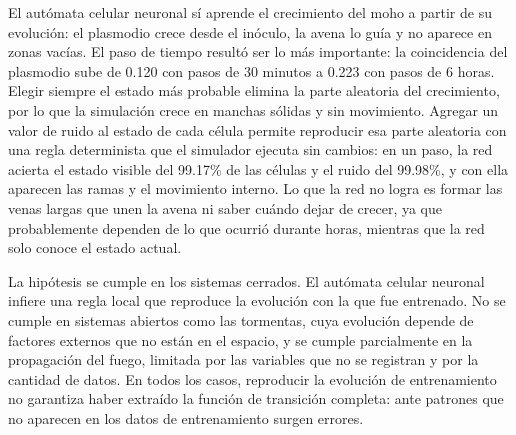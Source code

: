 El autómata celular neuronal sí aprende el crecimiento del moho a partir de su evolución: el plasmodio crece desde el inóculo, la avena lo guía y no aparece en zonas vacías. El paso de tiempo resultó ser lo más importante: la coincidencia del plasmodio sube de 0.120 con pasos de 30 minutos a 0.223 con pasos de 6 horas. Elegir siempre el estado más probable elimina la parte aleatoria del crecimiento, por lo que la simulación crece en manchas sólidas y sin movimiento. Agregar un valor de ruido al estado de cada célula permite reproducir esa parte aleatoria con una regla determinista que el simulador ejecuta sin cambios: en un paso, la red acierta el estado visible del 99.17\% de las células y el ruido del 99.98\%, y con ella aparecen las ramas y el movimiento interno. Lo que la red no logra es formar las venas largas que unen la avena ni saber cuándo dejar de crecer, ya que probablemente dependen de lo que ocurrió durante horas, mientras que la red solo conoce el estado actual.

La hipótesis se cumple en los sistemas cerrados. El autómata celular neuronal infiere una regla local que reproduce la evolución con la que fue entrenado. No se cumple en sistemas abiertos como las tormentas, cuya evolución depende de factores externos que no están en el espacio, y se cumple parcialmente en la propagación del fuego, limitada por las variables que no se registran y por la cantidad de datos. En todos los casos, reproducir la evolución de entrenamiento no garantiza haber extraído la función de transición completa: ante patrones que no aparecen en los datos de entrenamiento surgen errores.